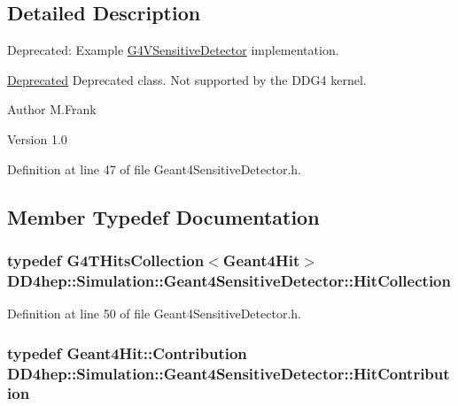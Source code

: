 \subsection{Detailed Description}
Deprecated: Example \hyperlink{class_g4_v_sensitive_detector}{G4VSensitiveDetector} implementation. \begin{Desc}
\item[\hyperlink{deprecated__deprecated000006}{Deprecated}]Deprecated class. Not supported by the DDG4 kernel.\end{Desc}
\begin{DoxyAuthor}{Author}
M.Frank 
\end{DoxyAuthor}
\begin{DoxyVersion}{Version}
1.0 
\end{DoxyVersion}


Definition at line 47 of file Geant4SensitiveDetector.h.

\subsection{Member Typedef Documentation}
\hypertarget{class_d_d4hep_1_1_simulation_1_1_geant4_sensitive_detector_a4865cf9c96edfef8cd41e309a4cd6211}{
\subsubsection[{HitCollection}]{\setlength{\rightskip}{0pt plus 5cm}typedef G4THitsCollection$<${\bf Geant4Hit}$>$ {\bf DD4hep::Simulation::Geant4SensitiveDetector::HitCollection}}}
\label{class_d_d4hep_1_1_simulation_1_1_geant4_sensitive_detector_a4865cf9c96edfef8cd41e309a4cd6211}


Definition at line 50 of file Geant4SensitiveDetector.h.\hypertarget{class_d_d4hep_1_1_simulation_1_1_geant4_sensitive_detector_a82e16b04c44370489f88b1e6a1ef2ab0}{
\subsubsection[{HitContribution}]{\setlength{\rightskip}{0pt plus 5cm}typedef {\bf Geant4Hit::Contribution} {\bf DD4hep::Simulation::Geant4SensitiveDetector::HitContribution}}}
\label{class_d_d4hep_1_1_simulation_1_1_geant4_sensitive_detector_a82e16b04c44370489f88b1e6a1ef2ab0}



